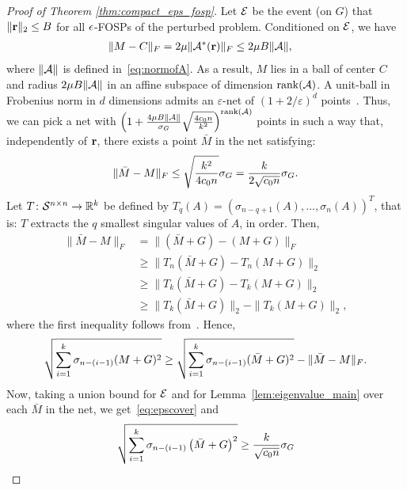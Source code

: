 \begin{proof}[Proof of Theorem \ref{thm:compact_eps_fosp}]
	Let $\mathcal{E}$ be the event (on $G$) that $\|\mathbf{r}\|_2  \leq B$ for all $\epsilon$-FOSPs of the perturbed problem.
	Conditioned on $\mathcal{E}$, we have
	\begin{align*}
		\|M - C\|_F & = 2\mu\|\mathcal{A}^*(\mathbf{r})\|_F \leq 2\mu B \|\mathcal{A}\|,
	\end{align*}
	where $\|\mathcal{A}\|$ is defined in~\eqref{eq:normofA}.
	As a result, $M$ lies in a ball of center $C$ and radius $2 \mu B\|\mathcal{A}\|$ in an affine subspace of dimension $\operatorname{rank}(\mathcal{A})$.  A unit-ball in Frobenius norm in $d$ dimensions admits an $\varepsilon$-net of $(1+2/\varepsilon)^d$ points~\citep[Cor.~4.2.13]{vershynin2016high}. Thus, we can pick a net with
	$\left( 1 + \frac{4 \mu  B\|\mathcal{A}\|}{\sigma_G} \sqrt{\frac{4c_0 n}{k^2}} \right)^{\operatorname{rank}(\mathcal{A})}$ points in such a way that, independently of $\mathbf{r}$, there exists a point $\bar M$ in the net satisfying:
	\begin{align}
		\| \bar M - M \|_F \leq \sqrt{\frac{k^2}{4c_0 n}} \sigma_G = \frac{k}{2\sqrt{c_0 n}}\sigma_G.
		\label{eq:epscover}
	\end{align}
	Let $T \colon \mathcal{S}^{n\times n} \to \mathbb{R}^{k}$ be defined by $T_q(A) = (\sigma_{n-q+1}(A), \ldots, \sigma_n(A))^T$, that is: $T$ extracts the $q$ smallest singular values of $A$, in order. Then,
	\begin{align*}
		\| \bar M - M \|_F & = \| (\bar M+G) - (M+G) \|_F \\
						   & \geq \| T_n(\bar M+G) - T_n(M + G) \|_2 \\
						   & \geq \| T_k(\bar M+G) - T_k(M + G) \|_2 \\
						   & \geq \| T_k(\bar M+G) \|_2 - \| T_k(M + G) \|_2,
	\end{align*}
	where the first inequality follows from~\citep[Ex.~IV.3.5]{bhatia2013matrix}. Hence,
	\begin{align}
		\sqrt{\sum_{i=1}^{k}\sigma_{n-(i-1)}(M+G)^2} \geq \sqrt{\sum_{i=1}^{k}\sigma_{n-(i-1)}(\bar M+G)^2} - \| \bar M - M \|_F. \label{eq:foo}
	\end{align}
	Now, taking a union bound for $\mathcal{E}$ and for Lemma~\ref{lem:eigenvalue_main} over each $\bar M$ in the net, we get~\eqref{eq:epscover} and
	\begin{align}
		\sqrt{ \sum_{i=1}^{k} \sigma_{n-(i-1)}\left(\bar M+G\right)^2 } \geq \frac{k}{\sqrt{c_0 n}} \sigma_G
		\label{eq:bar}
	\end{align}

\end{proof}
